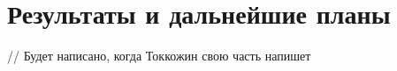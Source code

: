 \section{Результаты и дальнейшие планы}

// Будет написано, когда Токкожин свою часть напишет

\newpage
